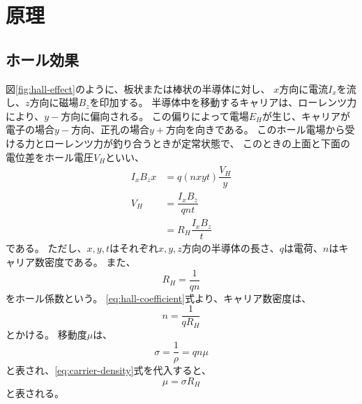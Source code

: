 \documentclass[../../../main]{subfiles}
\begin{document}
\section{原理}

\subsection{ホール効果}
図\ref{fig:hall-effect}のように、板状または棒状の半導体に対し、
$x$方向に電流$I_x$を流し、$z$方向に磁場$B_z$を印加する。
半導体中を移動するキャリアは、ローレンツ力により、$y-$方向に偏向される。
この偏りによって電場$E_H$が生じ、キャリアが電子の場合$y-$方向、正孔の場合$y+$方向を向きである。
このホール電場から受ける力とローレンツ力が釣り合うときが定常状態で、
このときの上面と下面の電位差をホール電圧$V_H$といい、
\begin{align}\label{eq:hall-voltage}
    I_x B_z x & = q (n x y t) \dfrac{V_H}{y} \nonumber \\
    V_H       & = \dfrac{I_x B_z}{q n t}               \\
              & = R_H \dfrac{I_x B_z}{t}
\end{align}
である。
ただし、$x, y, t$はそれぞれ$x, y, z$方向の半導体の長さ、$q$は電荷、$n$はキャリア数密度である。
また、
\begin{equation}\label{eq:hall-coefficient}
    R_H = \dfrac{1}{q n}
\end{equation}
をホール係数という。
\ref{eq:hall-coefficient}式より、キャリア数密度は、
\begin{equation}\label{eq:carrier-density}
    n = \dfrac{1}{q R_H}
\end{equation}
とかける。
移動度$\mu$は、
\begin{equation}\label{eq:mobility}
    \sigma = \dfrac{1}{\rho} = q n \mu
\end{equation}
と表され、\ref{eq:carrier-density}式を代入すると、
\begin{equation}\label{eq:mobility-1}
    \mu = \sigma R_H
\end{equation}
と表される。
\end{document}
